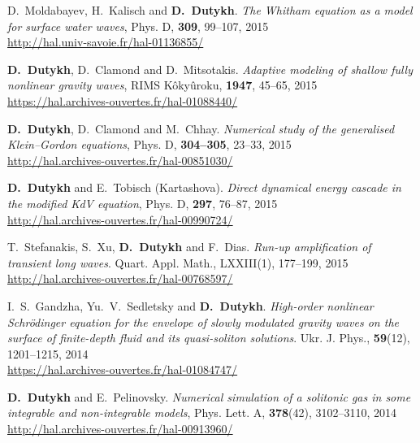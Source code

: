 \begin{etaremune}
  \item D.~Moldabayev, H.~Kalisch and \textbf{D.~Dutykh}. \textit{The Whitham equation as a model for surface water waves}, Phys. D, \textbf{309}, 99--107, 2015 \\ %
  \url{http://hal.univ-savoie.fr/hal-01136855/}
  
  \item \textbf{D.~Dutykh}, D.~Clamond and D.~Mitsotakis. \textit{Adaptive modeling of shallow fully nonlinear gravity waves}, RIMS K\^oky\^uroku, \textbf{1947}, 45--65, 2015 \\ %
  \url{https://hal.archives-ouvertes.fr/hal-01088440/}
  
  \item \textbf{D.~Dutykh}, D.~Clamond and M.~Chhay. \textit{Numerical study of the generalised Klein--Gordon equations}, Phys. D, \textbf{304--305}, 23--33, 2015 \\ %
  \url{http://hal.archives-ouvertes.fr/hal-00851030/}
  
  \item \textbf{D.~Dutykh} and E.~Tobisch (Kartashova). \textit{Direct dynamical energy cascade in the modified KdV equation}, Phys. D, \textbf{297}, 76--87, 2015 \\ %
  \url{http://hal.archives-ouvertes.fr/hal-00990724/}

  \item T.~Stefanakis, S.~Xu, \textbf{D.~Dutykh} and F.~Dias. \textit{Run-up amplification of transient long waves}. Quart. Appl. Math., LXXIII(1), 177--199, 2015 \\ %
  \url{http://hal.archives-ouvertes.fr/hal-00768597/}


  \item I.~S.~Gandzha, Yu.~V.~Sedletsky and \textbf{D.~Dutykh}. \textit{High-order nonlinear Schr\"odinger equation for the envelope of slowly modulated gravity waves on the surface of finite-depth fluid and its quasi-soliton solutions}. Ukr. J. Phys., \textbf{59}(12), 1201--1215, 2014 \\ %
  \url{https://hal.archives-ouvertes.fr/hal-01084747/}
  
  \item \textbf{D.~Dutykh} and E.~Pelinovsky. \textit{Numerical simulation of a solitonic gas in some integrable and non-integrable models}, Phys. Lett. A, \textbf{378}(42), 3102--3110, 2014 \\ %
  \url{http://hal.archives-ouvertes.fr/hal-00913960/}
  

\end{etaremune}
